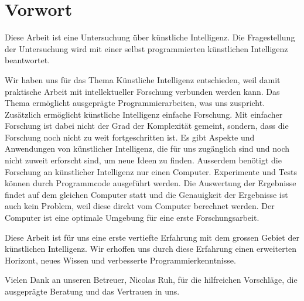 \chapter{Vorwort}
Diese Arbeit ist eine Untersuchung über künstliche Intelligenz. Die
Fragestellung der Untersuchung wird mit einer selbst programmierten künstlichen
Intelligenz beantwortet. 

Wir haben uns für das Thema Künstliche Intelligenz entschieden, weil damit
praktische Arbeit mit intellektueller Forschung verbunden werden kann. Das Thema
ermöglicht ausgeprägte Programmierarbeiten, was uns zuspricht. Zusätzlich
ermöglicht künstliche Intelligenz einfache Forschung. Mit einfacher Forschung
ist dabei nicht der Grad der Komplexität gemeint, sondern, dass die Forschung
noch nicht zu weit fortgeschritten ist. Es gibt Aspekte und Anwendungen von
künstlicher Intelligenz, die für uns zugänglich sind und noch nicht zuweit
erforscht sind, um neue Ideen zu finden. Ausserdem benötigt die Forschung an
künstlicher Intelligenz nur einen Computer. Experimente und Tests können durch
Programmcode ausgeführt werden. Die Auswertung der Ergebnisse findet auf dem
gleichen Computer statt und die Genauigkeit der Ergebnisse ist auch kein
Problem, weil diese direkt vom Computer berechnet werden. Der Computer ist eine
optimale Umgebung für eine erste Forschungsarbeit.

Diese Arbeit ist für uns eine erste vertiefte Erfahrung mit dem grossen Gebiet
der künstlichen Intelligenz. Wir erhoffen uns durch diese Erfahrung einen
erweiterten Horizont, neues Wissen und verbesserte Programmierkenntnisse.

Vielen Dank an unseren Betreuer, Nicolas Ruh, für die hilfreichen Vorschläge,
die ausgeprägte Beratung und das Vertrauen in uns.


